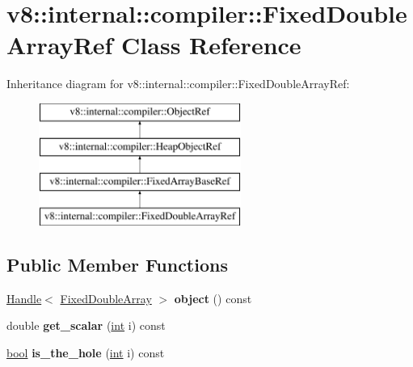\hypertarget{classv8_1_1internal_1_1compiler_1_1FixedDoubleArrayRef}{}\section{v8\+:\+:internal\+:\+:compiler\+:\+:Fixed\+Double\+Array\+Ref Class Reference}
\label{classv8_1_1internal_1_1compiler_1_1FixedDoubleArrayRef}
Inheritance diagram for v8\+:\+:internal\+:\+:compiler\+:\+:Fixed\+Double\+Array\+Ref\+:\begin{figure}[H]
\begin{center}
\leavevmode
\includegraphics[height=4.000000cm]{classv8_1_1internal_1_1compiler_1_1FixedDoubleArrayRef}
\end{center}
\end{figure}
\subsection*{Public Member Functions}
\begin{DoxyCompactItemize}
\item 
\mbox{\label{classv8_1_1internal_1_1compiler_1_1FixedDoubleArrayRef_aa8fc9e132e23f9786095beb5d44e2a3d}} 
\mbox{\hyperlink{classv8_1_1internal_1_1Handle}{Handle}}$<$ \mbox{\hyperlink{classv8_1_1internal_1_1FixedDoubleArray}{Fixed\+Double\+Array}} $>$ {\bfseries object} () const
\item 
\mbox{\label{classv8_1_1internal_1_1compiler_1_1FixedDoubleArrayRef_a4c3a1faedcc8d240f525139c7b6e9032}} 
double {\bfseries get\+\_\+scalar} (\mbox{\hyperlink{classint}{int}} i) const
\item 
\mbox{\label{classv8_1_1internal_1_1compiler_1_1FixedDoubleArrayRef_a9a1ae947c2bfe92a999d8d05c1e55f6a}} 
\mbox{\hyperlink{classbool}{bool}} {\bfseries is\+\_\+the\+\_\+hole} (\mbox{\hyperlink{classint}{int}} i) const
\end{DoxyCompactItemize}
